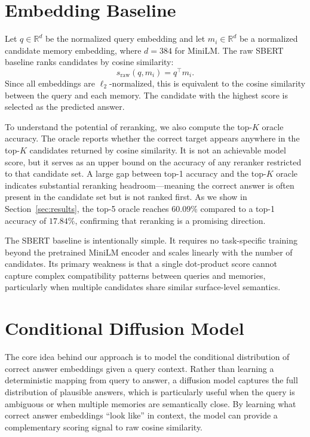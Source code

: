 \documentclass{article}
\begin{document}
\section{Embedding Baseline}
\label{sec:baseline}

Let $q \in \mathbb{R}^d$ be the normalized query embedding and let $m_i \in \mathbb{R}^d$ be a normalized candidate memory embedding, where $d=384$ for MiniLM. The raw SBERT baseline ranks candidates by cosine similarity:
\begin{equation}
  s_{\mathrm{raw}}(q, m_i) = q^\top m_i.
\end{equation}
Since all embeddings are $\ell_2$-normalized, this is equivalent to the cosine similarity between the query and each memory. The candidate with the highest score is selected as the predicted answer.

To understand the potential of reranking, we also compute the top-$K$ oracle accuracy. The oracle reports whether the correct target appears anywhere in the top-$K$ candidates returned by cosine similarity. It is not an achievable model score, but it serves as an upper bound on the accuracy of any reranker restricted to that candidate set. A large gap between top-1 accuracy and the top-$K$ oracle indicates substantial reranking headroom---meaning the correct answer is often present in the candidate set but is not ranked first. As we show in Section~\ref{sec:results}, the top-5 oracle reaches $60.09\%$ compared to a top-1 accuracy of $17.84\%$, confirming that reranking is a promising direction.

The SBERT baseline is intentionally simple. It requires no task-specific training beyond the pretrained MiniLM encoder and scales linearly with the number of candidates. Its primary weakness is that a single dot-product score cannot capture complex compatibility patterns between queries and memories, particularly when multiple candidates share similar surface-level semantics.

\section{Conditional Diffusion Model}
\label{sec:diffusion}

The core idea behind our approach is to model the conditional distribution of correct answer embeddings given a query context. Rather than learning a deterministic mapping from query to answer, a diffusion model captures the full distribution of plausible answers, which is particularly useful when the query is ambiguous or when multiple memories are semantically close. By learning what correct answer embeddings ``look like'' in context, the model can provide a complementary scoring signal to raw cosine similarity.
\end{document}
